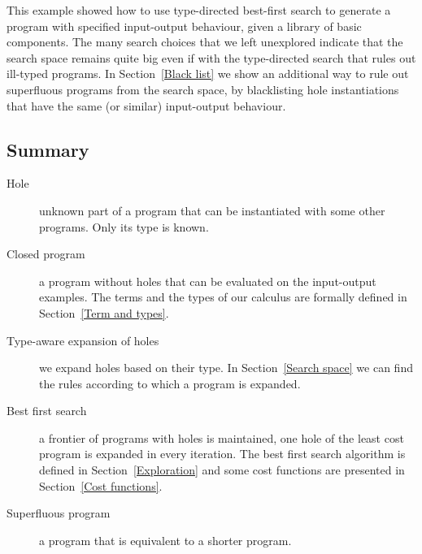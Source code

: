 This example showed how to use type-directed best-first search to generate a program with specified input-output behaviour, given a library of basic components.  The many search choices that we left unexplored indicate that the search space remains quite big even if with the type-directed search that rules out ill-typed programs.  In Section~\ref{Black list} we show an additional way to rule out superfluous programs from the search space, by blacklisting hole instantiations that have the same (or similar) input-output behaviour.

\subsection{Summary}
\begin{description}
\item[Hole] unknown part of a program that can be instantiated with some other programs. Only its type is known.
\item[Closed program] a program without holes that can be evaluated on the input-output examples. The terms and the types of our calculus are formally defined in Section~\ref{Term and types}.
\item[Type-aware expansion of holes] we expand holes based on their type. In Section~\ref{Search space} we can find the rules according to which a program is expanded.
\item[Best first search] a frontier of programs with holes is maintained, one hole of the least cost program is expanded in every iteration. The best first search algorithm is defined in Section~\ref{Exploration} and some cost functions are presented in Section~\ref{Cost functions}.
\item[Superfluous program] a program that is equivalent to a shorter program.
\end{description}
